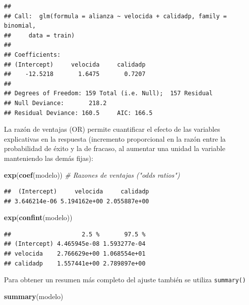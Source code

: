 \documentclass[
  spanish,
]{book}
\newenvironment{Shaded}{\begin{snugshade}}{\end{snugshade}}
\newcommand{\CommentTok}[1]{\textcolor[rgb]{0.56,0.35,0.01}{\textit{#1}}}
\newcommand{\KeywordTok}[1]{\textcolor[rgb]{0.13,0.29,0.53}{\textbf{#1}}}
\newcommand{\NormalTok}[1]{#1}
\theoremstyle{break}
\theoremstyle{definition}
\theoremstyle{definition}
\theoremstyle{definition}
\theoremstyle{remark}
\begin{document}
\begin{verbatim}
## 
## Call:  glm(formula = alianza ~ velocida + calidadp, family = binomial, 
##     data = train)
## 
## Coefficients:
## (Intercept)     velocida     calidadp  
##    -12.5218       1.6475       0.7207  
## 
## Degrees of Freedom: 159 Total (i.e. Null);  157 Residual
## Null Deviance:       218.2 
## Residual Deviance: 160.5     AIC: 166.5
\end{verbatim}

La razón de ventajas (OR) permite cuantificar el efecto de las variables explicativas en la respuesta (incremento proporcional en la razón entre la probabilidad de éxito y la de fracaso, al aumentar una unidad la variable manteniendo las demás fijas):

\begin{Shaded}
\begin{Highlighting}[]
\KeywordTok{exp}\NormalTok{(}\KeywordTok{coef}\NormalTok{(modelo))  }\CommentTok{# Razones de ventajas ("odds ratios")}
\end{Highlighting}
\end{Shaded}

\begin{verbatim}
##  (Intercept)     velocida     calidadp 
## 3.646214e-06 5.194162e+00 2.055887e+00
\end{verbatim}

\begin{Shaded}
\begin{Highlighting}[]
\KeywordTok{exp}\NormalTok{(}\KeywordTok{confint}\NormalTok{(modelo))}
\end{Highlighting}
\end{Shaded}

\begin{verbatim}
##                    2.5 %       97.5 %
## (Intercept) 4.465945e-08 1.593277e-04
## velocida    2.766629e+00 1.068554e+01
## calidadp    1.557441e+00 2.789897e+00
\end{verbatim}

Para obtener un resumen más completo del ajuste también se utiliza \texttt{summary()}

\begin{Shaded}
\begin{Highlighting}[]
\KeywordTok{summary}\NormalTok{(modelo)}
\end{Highlighting}
\end{Shaded}
\end{document}
